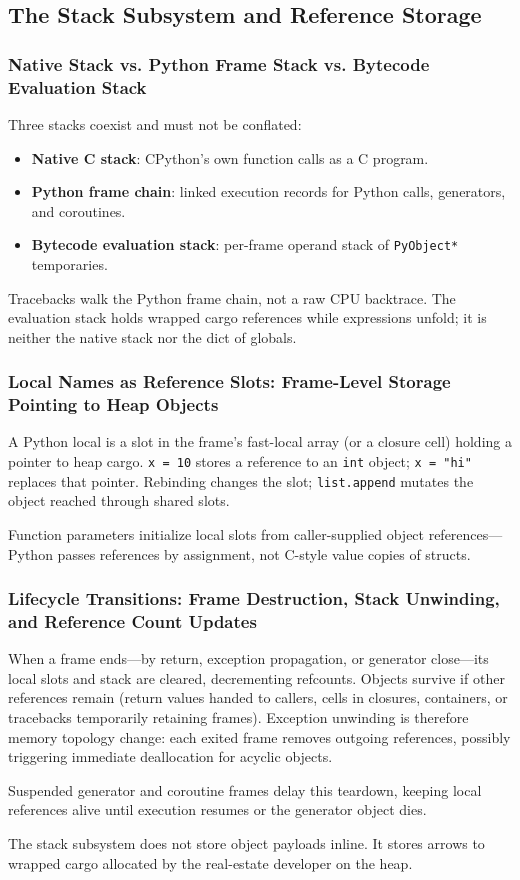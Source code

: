 \subsection{The Stack Subsystem and Reference Storage}


\subsubsection{Native Stack vs. Python Frame Stack vs. Bytecode Evaluation Stack}

Three stacks coexist and must not be conflated:

\begin{itemize}
    \item \textbf{Native C stack}: CPython's own function calls as a C program.
    \item \textbf{Python frame chain}: linked execution records for Python calls, generators, and coroutines.
    \item \textbf{Bytecode evaluation stack}: per-frame operand stack of \texttt{PyObject*} temporaries.
\end{itemize}

Tracebacks walk the Python frame chain, not a raw CPU backtrace. The evaluation stack holds wrapped cargo references while expressions unfold; it is neither the native stack nor the dict of globals.

\subsubsection{Local Names as Reference Slots: Frame-Level Storage Pointing to Heap Objects}

A Python local is a slot in the frame's fast-local array (or a closure cell) holding a pointer to heap cargo. \texttt{x = 10} stores a reference to an \texttt{int} object; \texttt{x = "hi"} replaces that pointer. Rebinding changes the slot; \texttt{list.append} mutates the object reached through shared slots.

Function parameters initialize local slots from caller-supplied object references---Python passes references by assignment, not C-style value copies of structs.

\subsubsection{Lifecycle Transitions: Frame Destruction, Stack Unwinding, and Reference Count Updates}

When a frame ends---by return, exception propagation, or generator close---its local slots and stack are cleared, decrementing refcounts. Objects survive if other references remain (return values handed to callers, cells in closures, containers, or tracebacks temporarily retaining frames). Exception unwinding is therefore memory topology change: each exited frame removes outgoing references, possibly triggering immediate deallocation for acyclic objects.

Suspended generator and coroutine frames delay this teardown, keeping local references alive until execution resumes or the generator object dies.

The stack subsystem does not store object payloads inline. It stores arrows to wrapped cargo allocated by the real-estate developer on the heap.
